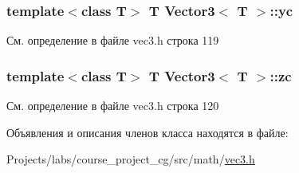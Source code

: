 \subsubsection[{\texorpdfstring{yc}{yc}}]{\setlength{\rightskip}{0pt plus 5cm}template$<$class T$>$ T {\bf Vector3}$<$ T $>$\+::yc\hspace{0.3cm}{\ttfamily [private]}}\hypertarget{class_vector3_a0b0084b4c366805a4cf48558fc21c4a8}{}\label{class_vector3_a0b0084b4c366805a4cf48558fc21c4a8}


См. определение в файле vec3.\+h строка 119

\subsubsection[{\texorpdfstring{zc}{zc}}]{\setlength{\rightskip}{0pt plus 5cm}template$<$class T$>$ T {\bf Vector3}$<$ T $>$\+::zc\hspace{0.3cm}{\ttfamily [private]}}\hypertarget{class_vector3_a5ba4eecf62db2872046d9e3fe01fb406}{}\label{class_vector3_a5ba4eecf62db2872046d9e3fe01fb406}


См. определение в файле vec3.\+h строка 120



Объявления и описания членов класса находятся в файле\+:\begin{DoxyCompactItemize}
\item 
Projects/labs/course\+\_\+project\+\_\+cg/src/math/\hyperlink{vec3_8h}{vec3.\+h}\end{DoxyCompactItemize}
